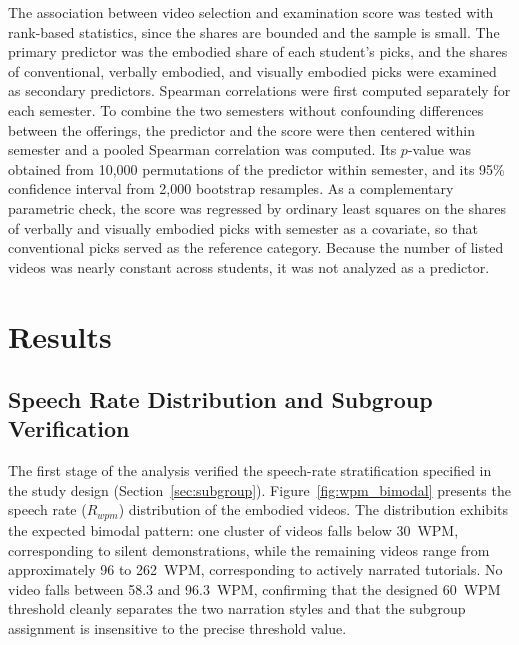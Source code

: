 \documentclass[fleqn,10pt]{JLA_article} %
\begin{document}
The association between video selection and examination score was tested with rank-based statistics, since the shares are bounded and the sample is small. The primary predictor was the embodied share of each student's picks, and the shares of conventional, verbally embodied, and visually embodied picks were examined as secondary predictors. Spearman correlations were first computed separately for each semester. To combine the two semesters without confounding differences between the offerings, the predictor and the score were then centered within semester and a pooled Spearman correlation was computed. Its $p$-value was obtained from 10{,}000 permutations of the predictor within semester, and its 95\% confidence interval from 2{,}000 bootstrap resamples. As a complementary parametric check, the score was regressed by ordinary least squares on the shares of verbally and visually embodied picks with semester as a covariate, so that conventional picks served as the reference category. Because the number of listed videos was nearly constant across students, it was not analyzed as a predictor.


\section{Results}
\label{sec:results}
\datatable
{}\ytdatatable

\subsection{Speech Rate Distribution and Subgroup Verification}

The first stage of the analysis verified the speech-rate stratification specified in the study design (Section~\ref{sec:subgroup}). Figure~\ref{fig:wpm_bimodal} presents the speech rate ($R_{wpm}$) distribution of the embodied videos. The distribution exhibits the expected bimodal pattern: one cluster of videos falls below 30~WPM, corresponding to silent demonstrations, while the remaining videos range from approximately 96 to 262~WPM, corresponding to actively narrated tutorials. No video falls between 58.3 and 96.3~WPM, confirming that the designed 60~WPM threshold cleanly separates the two narration styles and that the subgroup assignment is insensitive to the precise threshold value.
\end{document}
